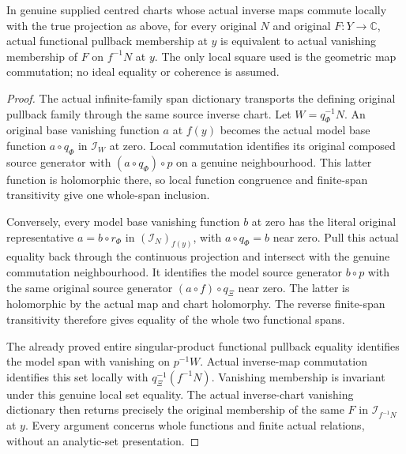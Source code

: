 \begin{lemma}
\label{hir:actual-singular-submersion-product-functional-dictionary}
\leanok
In genuine supplied centred charts whose actual inverse maps commute
locally with the true projection as above, for every original $N$ and
original $F:Y\to\mathbb C$, actual functional pullback membership at
$y$ is equivalent to actual vanishing membership of $F$ on $f^{-1}N$
at $y$. The only local square used is the geometric map commutation;
no ideal equality or coherence is assumed.
\end{lemma}
\begin{proof}
The actual infinite-family span dictionary transports the defining
original pullback family through the same source inverse chart.
Let $W=q_\Phi^{-1}N$. An original base vanishing function $a$ at $f(y)$
becomes the actual model base function $a\circ q_\Phi$ in
$\mathcal I_W$ at zero. Local commutation identifies its original
composed source generator with $(a\circ q_\Phi)\circ p$ on a genuine
neighbourhood. This latter function is holomorphic there, so local
function congruence and finite-span transitivity give one whole-span
inclusion.

Conversely, every model base vanishing function $b$ at zero has the
literal original representative $a=b\circ r_\Phi$ in
$(\mathcal I_N)_{f(y)}$, with $a\circ q_\Phi=b$ near zero. Pull this
actual equality back through the continuous projection and intersect
with the genuine commutation neighbourhood. It identifies the model
source generator $b\circ p$ with the same original source generator
$(a\circ f)\circ q_\Xi$ near zero. The latter is holomorphic by the
actual map and chart holomorphy. The reverse finite-span transitivity
therefore gives equality of the whole two functional spans.

The already proved entire singular-product functional pullback equality
identifies the model span with vanishing on $p^{-1}W$. Actual inverse-map
commutation identifies this set locally with $q_\Xi^{-1}(f^{-1}N)$.
Vanishing membership is invariant under this genuine local set equality.
The actual inverse-chart vanishing dictionary then returns precisely
the original membership of the same $F$ in
$\mathcal I_{f^{-1}N}$ at $y$. Every argument concerns whole functions
and finite actual relations, without an analytic-set presentation.
\end{proof}

